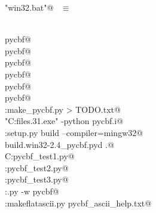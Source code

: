 \documentclass[10pt,a4paper,twoside,notitlepage]{article}
\begin{document}
\begin{flushleft} \small
\begin{minipage}{\linewidth} \label{scrap14}
\verb@"win32.bat"@\nobreak\ {\footnotesize {} }$\equiv$
\vspace{-1ex}
\begin{list}{}{} \item
\mbox{}\verb@@\\
\mbox{}\verb@nuweb pycbf@\\
\mbox{}\verb@latex pycbf@\\
\mbox{}\verb@nuweb pycbf@\\
\mbox{}\verb@latex pycbf@\\
\mbox{}\verb@dvipdfm pycbf@\\
\mbox{}\verb@nuweb pycbf@\\
\mbox{}\verb@C:\python make_pycbf.py > TODO.txt@\\
\mbox{}\verb@"C:\program files.31\swig.exe" -python pycbf.i@\\
\mbox{}\verb@C:\python setup.py build --compiler=mingw32@\\
\mbox{}\verb@copy build\lib.win32-2.4\_pycbf.pyd .@\\
\mbox{}\verb@REM C:\python pycbf_test1.py@\\
\mbox{}\verb@C:\python pycbf_test2.py@\\
\mbox{}\verb@C:\python pycbf_test3.py@\\
\mbox{}\verb@C:\lib\pydoc.py -w pycbf@\\
\mbox{}\verb@C:\python makeflatascii.py pycbf_ascii_help.txt@\\
\mbox{}\verb@@{\NWsep}
\end{list}
\vspace{-2ex}
\end{minipage}\\[4ex]
\end{flushleft}
\end{document}
